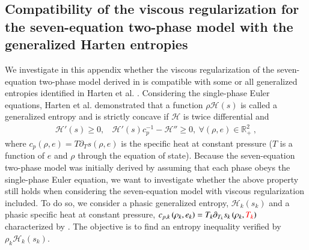 \documentclass[preprint,10pt]{elsarticle}
\begin{document}
{\begin{appendices}
\section{Compatibility of the viscous regularization for the seven-equation two-phase model with the generalized Harten entropies}\label{app:harden}
We investigate in this appendix whether the viscous regularization of the seven-equation two-phase model derived in  is compatible with some or all generalized entropies identified in Harten et al. \cite{Harten}. Considering the single-phase Euler equations, Harten et al. \cite{Harten} demonstrated that a function $\rho \mathscr{H}(s)$ is called a generalized entropy and is strictly concave if $\mathscr{H}$ is twice differential and
%
\begin{multline}\label{eq:generalized_ent}
\mathscr{H}' (s)  \geq 0, \ \ \ \ \mathscr{H}'(s)c_p^{-1} - \mathscr{H}'' \geq 0, \ \forall \left( \rho, e \right) \in \mathbb{R}_+^2 \ ,
\end{multline}
%
where $c_p \left( \rho, e \right) = T \partial_T s \left( \rho, e \right)$ is the specific heat at constant pressure ($T$ is a function of $e$ and $\rho$ through the equation of state). Because the seven-equation two-phase model was initially derived by assuming that each phase obeys the single-phase Euler equation, we want to investigate whether the above property still holds when considering the seven-equation model with viscous regularization included. To do so, we consider a phasic generalized entropy, $\mathscr{H}_k(s_k)$ and a phasic specific heat at constant pressure, $c_{p,k} \left( \rho_k, e_k \right) = T_k \partial_{T_k} s_k \left( \rho_k, \textcolor{red}{T_k} \right)$  characterized by . The objective is to find an entropy inequality verified by $\rho_k \mathscr{H}_k(s_k)$.


\end{appendices}}
\end{document}
